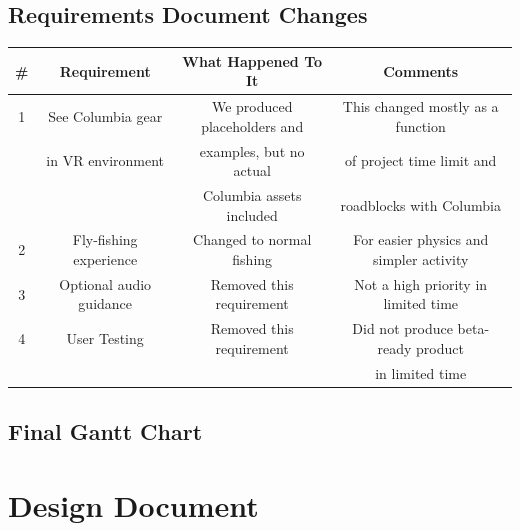\documentclass[10pt,journal,compsoc,onecolumn, draftclsnofoot]{IEEEtran}
\begin{document}
\subsection{Requirements Document Changes}

\begin{center}
  \begin{tabular}{|c|c|c|c|}
    \hline
    \# & Requirement & What Happened To It & Comments \\ [0.5ex]
    \hline
    1 & See Columbia gear & We produced placeholders and & This changed mostly as a function \\
    & in VR environment & examples, but no actual & of project time limit and \\
    & & Columbia assets included & roadblocks with Columbia \\
    \hline
    2 & Fly-fishing experience & Changed to normal fishing & For easier physics and simpler activity \\
    \hline
    3 & Optional audio guidance & Removed this requirement & Not a high priority in limited time \\
    \hline
    4 & User Testing & Removed this requirement & Did not produce beta-ready product \\
    & & & in limited time \\
    \hline

  \end{tabular}
\end{center}


\subsection{Final Gantt Chart}
\begin{gantt}{8}{7}
	\begin{ganttitle}
	\end{ganttitle}
\end{gantt}

\section{Design Document}
\end{document}
